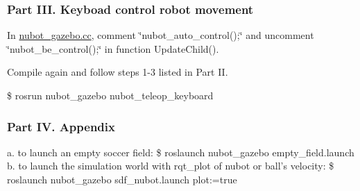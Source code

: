 \subsubsection*{Part I\-I\-I. Keyboad control robot movement}


\begin{DoxyEnumerate}
\item In \hyperlink{nubot__gazebo_8cc}{nubot\-\_\-gazebo.\-cc}, comment \char`\"{}nubot\-\_\-auto\-\_\-control();\char`\"{} and uncomment \char`\"{}nubot\-\_\-be\-\_\-control();\char`\"{} in function Update\-Child().
\item Compile again and follow steps 1-\/3 listed in Part I\-I.
\item \$ rosrun nubot\-\_\-gazebo nubot\-\_\-teleop\-\_\-keyboard
\end{DoxyEnumerate}

\subsubsection*{Part I\-V. Appendix}

a. to launch an empty soccer field\-: \$ roslaunch nubot\-\_\-gazebo empty\-\_\-field.\-launch b. to launch the simulation world with rqt\-\_\-plot of nubot or ball's velocity\-: \$ roslaunch nubot\-\_\-gazebo sdf\-\_\-nubot.\-launch plot\-:=true 